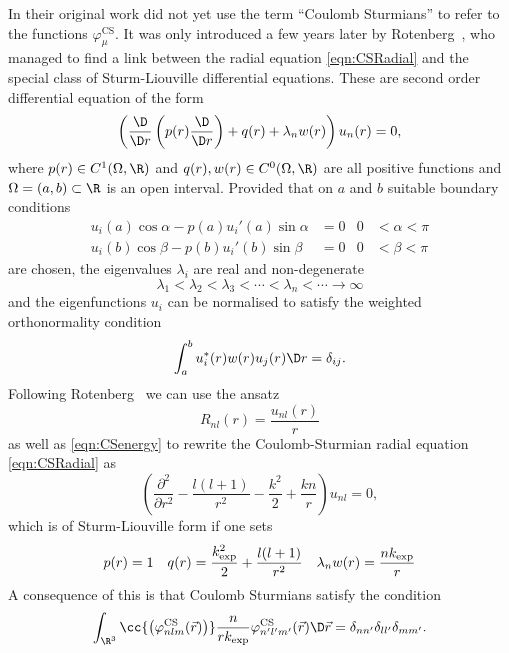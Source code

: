 In their original work \citet{Shull1959} did not yet use the term ``Coulomb Sturmians''
to refer to the functions $\varphi^\text{CS}_\mu$.
It was only introduced a few years later
by Rotenberg~\cite{Rotenberg1962,Rotenberg1970},
who managed to find a link between the \CS radial equation \eqref{eqn:CSRadial}
and the special class of Sturm-Liouville differential equations.
These are second order differential equation of the form
\begin{equation}
	\left(
	\frac{\D}{\D r} \left( p(r) \frac{\D}{\D r} \right) + q(r) + \lambda_n w(r) \right) u_n(r) = 0,
	\label{eqn:SturmLiouville}
\end{equation}
where $p(r) \in C^1(\Omega, \R)$ and $q(r), w(r) \in C^0(\Omega, \R)$ are all positive
functions and $\Omega = (a,b) \subset \R$ is an open interval.
Provided that on $a$ and $b$ suitable boundary conditions
\begin{align*}
	u_i(a) \cos \alpha - p(a) u_i'(a) \sin \alpha &= 0 & 0 &< \alpha < \pi \\
	u_i(b) \cos \beta - p(b) u_i'(b) \sin \beta &= 0 & 0 &< \beta < \pi
\end{align*}
are chosen,
the eigenvalues $\lambda_i$ are real and non-degenerate
\[ \lambda_1 < \lambda_2 < \lambda_3 < \cdots < \lambda_n < \cdots \to \infty \]
and the eigenfunctions $u_i$ can be normalised
to satisfy the weighted orthonormality condition
\begin{equation}
	\int_a^b u_i^\ast(r) w(r) u_j(r) \D r = \delta_{ij}.
	\label{eqn:SturmLiouvilleWeightedOrtho}
\end{equation}
Following Rotenberg~\cite{Rotenberg1962,Rotenberg1970} we can use the ansatz
\[ R_{nl}(r) = \frac{u_{nl}(r)}{r} \]
as well as \eqref{eqn:CSenergy} to rewrite the Coulomb-Sturmian radial equation
\eqref{eqn:CSRadial} as
\[ \left(\frac{\partial^2}{\partial r^2} - \frac{l (l+1)}{r^2} - \frac{k^2}{2} + \frac{kn}{r} \right)
u_{nl} = 0, \]
which is of Sturm-Liouville form if one sets
\begin{align*}
	p(r) &= 1 & q(r) &= \frac{k_\text{exp}^2}{2} + \frac{l (l+1)}{r^2} & \lambda_n w(r) = \frac{nk_\text{exp}}{r}
\end{align*}
A consequence of this is that Coulomb Sturmians satisfy
the  condition~\cite{Avery2006}
\begin{equation}
	\int_{\R^3} \cc{\left(\varphi^\text{CS}_{nlm}(\vec{r})\right)}
		\frac{n}{r\kexp}  \varphi^\text{CS}_{n'l'm'}(\vec{r})
		\D \vec{r} = \delta_{n n'} \delta_{l l'} \delta_{m m'}.
	\label{eqn:CoulombSturmianWeightedOrtho}
\end{equation}
